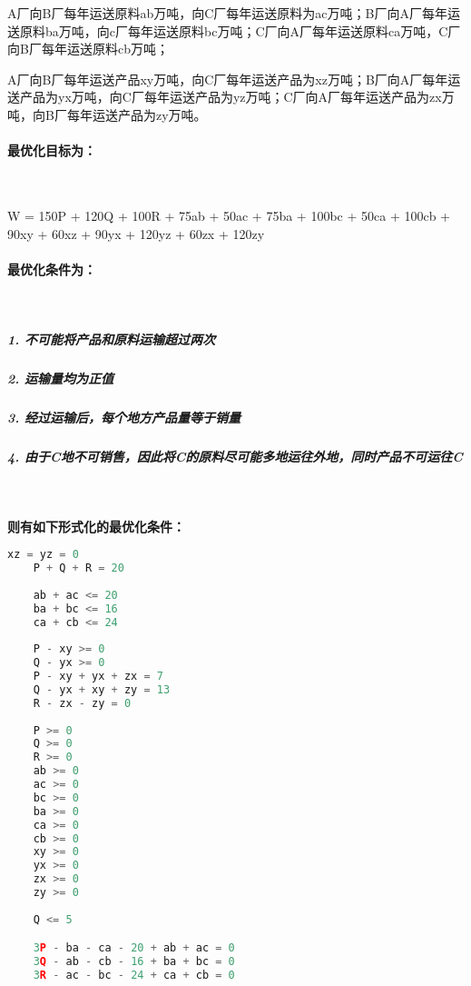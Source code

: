 \documentclass[UTF8]{ctexart}
\begin{document}
    A厂向B厂每年运送原料ab万吨，向C厂每年运送原料为ac万吨；B厂向A厂每年运送原料ba万吨，向c厂每年运送原料bc万吨；C厂向A厂每年运送原料ca万吨，C厂向B厂每年运送原料cb万吨；

    A厂向B厂每年运送产品xy万吨，向C厂每年运送产品为xz万吨；B厂向A厂每年运送产品为yx万吨，向C厂每年运送产品为yz万吨；C厂向A厂每年运送产品为zx万吨，向B厂每年运送产品为zy万吨。

    \paragraph{最优化目标为：}

    ~

    W = 150P + 120Q + 100R + 75ab + 50ac + 75ba + 100bc + 50ca + 100cb + 90xy + 60xz + 90yx + 120yz + 60zx + 120zy

    \paragraph{最优化条件为：}

    ~

    \subparagraph{1. 不可能将产品和原料运输超过两次}

    \subparagraph{2. 运输量均为正值}

    \subparagraph{3. 经过运输后，每个地方产品量等于销量}

    \subparagraph{4. 由于C地不可销售，因此将C的原料尽可能多地运往外地，同时产品不可运往C}

    ~

    \textbf{则有如下形式化的最优化条件：}

    \begin{lstlisting}[language=c]
    xz = yz = 0
    P + Q + R = 20
    
    ab + ac <= 20
    ba + bc <= 16
    ca + cb <= 24
    
    P - xy >= 0
    Q - yx >= 0
    P - xy + yx + zx = 7
    Q - yx + xy + zy = 13
    R - zx - zy = 0
    
    P >= 0
    Q >= 0
    R >= 0
    ab >= 0
    ac >= 0
    bc >= 0
    ba >= 0
    ca >= 0
    cb >= 0
    xy >= 0
    yx >= 0
    zx >= 0
    zy >= 0
    
    Q <= 5

    3P - ba - ca - 20 + ab + ac = 0
    3Q - ab - cb - 16 + ba + bc = 0
    3R - ac - bc - 24 + ca + cb = 0
    \end{lstlisting}
\end{document}
